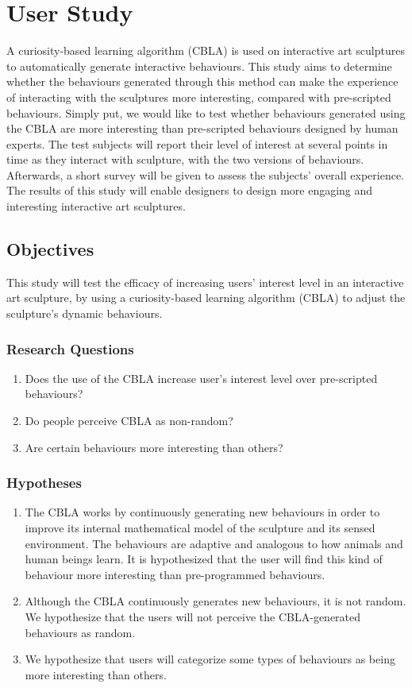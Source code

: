 \section{User Study}

A curiosity-based learning algorithm (CBLA) is used on interactive art sculptures to automatically generate interactive behaviours. This study aims to determine whether the behaviours generated through this method can make the experience of interacting with the sculptures more interesting, compared with pre-scripted behaviours. Simply put, we would like to test whether behaviours generated using the CBLA are more interesting than pre-scripted behaviours designed by human experts. The test subjects will report their level of interest at several points in time as they interact with sculpture, with the two versions of behaviours. Afterwards, a short survey will be given to assess the subjects' overall experience. The results of this study will enable designers to design more engaging and interesting interactive art sculptures. 

\subsection{Objectives}
This study will test the efficacy of increasing users' interest level in an interactive art sculpture, by using a curiosity-based learning algorithm (CBLA) to adjust the sculpture's dynamic behaviours. 

\subsubsection{Research Questions}
\begin{enumerate}
	\item Does the use of the CBLA increase user's interest level over pre-scripted behaviours?
	\item Do people perceive CBLA as non-random?
	\item Are certain behaviours  more interesting than others?
\end{enumerate}


\subsubsection{Hypotheses}
\begin{enumerate}
	\item The CBLA works by continuously generating new behaviours in order to improve its internal mathematical model of the sculpture and its sensed environment. The behaviours are adaptive and analogous to how animals and human beings learn. It is hypothesized that the user will find this kind of behaviour more interesting than pre-programmed behaviours.
	\item Although the CBLA continuously generates new behaviours, it is not random. We hypothesize that the users will not perceive the CBLA-generated behaviours as random. 
	\item We hypothesize that users will categorize some types of behaviours as being more interesting than others. 
\end{enumerate}

